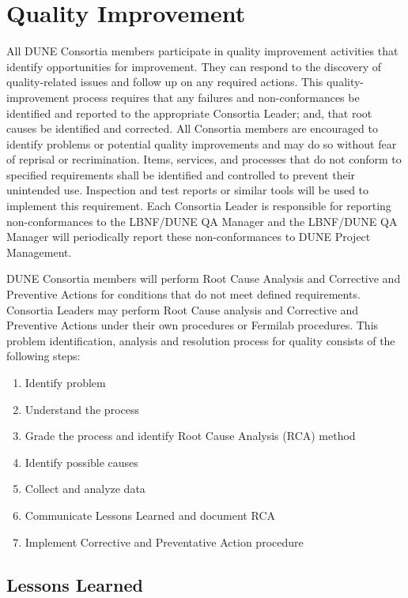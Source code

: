 \section{Quality Improvement}

All DUNE Consortia members participate in quality improvement
activities that identify opportunities for improvement. They can
respond to the discovery of quality-related issues and follow up on
any required actions. This quality-improvement process requires that
any failures and non-conformances be identified and reported to the
appropriate Consortia Leader; and, that root causes be identified and
corrected. All Consortia members are encouraged to identify problems
or potential quality improvements and may do so without fear of
reprisal or recrimination. Items, services, and processes that do not
conform to specified requirements shall be identified and controlled
to prevent their unintended use. Inspection and test reports or
similar tools will be used to implement this requirement. Each
Consortia Leader is responsible for reporting non-conformances to the
LBNF/DUNE QA Manager and the LBNF/DUNE QA Manager will periodically
report these non-conformances to DUNE Project Management.

DUNE Consortia members will perform Root Cause Analysis and Corrective
and Preventive Actions for conditions that do not meet defined
requirements. Consortia Leaders may perform Root Cause analysis and
Corrective and Preventive Actions under their own procedures or
Fermilab procedures.  This problem identification, analysis and
resolution process for quality consists of the following steps:
\begin{enumerate}
 \item Identify problem
 \item Understand the process
 \item Grade the process and identify Root Cause Analysis (RCA) method
 \item Identify possible causes
 \item Collect and analyze data
 \item Communicate Lessons Learned and document RCA
 \item Implement Corrective and Preventative Action procedure
\end{enumerate}

\subsection{Lessons Learned}


